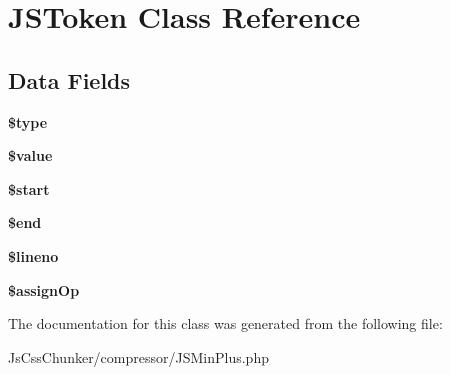 \hypertarget{class_j_s_token}{
\section{JSToken Class Reference}
\label{class_j_s_token}
}
\subsection*{Data Fields}
\begin{DoxyCompactItemize}
\item 
\hypertarget{class_j_s_token_a9a4a6fba2208984cabb3afacadf33919}{
{\bfseries \$type}}
\label{class_j_s_token_a9a4a6fba2208984cabb3afacadf33919}

\item 
\hypertarget{class_j_s_token_a0f298096f322952a72a50f98a74c7b60}{
{\bfseries \$value}}
\label{class_j_s_token_a0f298096f322952a72a50f98a74c7b60}

\item 
\hypertarget{class_j_s_token_a50a00e7de77365e00b117e73aa82fb9b}{
{\bfseries \$start}}
\label{class_j_s_token_a50a00e7de77365e00b117e73aa82fb9b}

\item 
\hypertarget{class_j_s_token_ac2040b96cd66d4d79b1d9fe0027d2f9b}{
{\bfseries \$end}}
\label{class_j_s_token_ac2040b96cd66d4d79b1d9fe0027d2f9b}

\item 
\hypertarget{class_j_s_token_a865384ce49abf1c78f8aea48c7b5aa48}{
{\bfseries \$lineno}}
\label{class_j_s_token_a865384ce49abf1c78f8aea48c7b5aa48}

\item 
\hypertarget{class_j_s_token_ade1832ae0fb4317657c735b13166c843}{
{\bfseries \$assignOp}}
\label{class_j_s_token_ade1832ae0fb4317657c735b13166c843}

\end{DoxyCompactItemize}


The documentation for this class was generated from the following file:\begin{DoxyCompactItemize}
\item 
JsCssChunker/compressor/JSMinPlus.php\end{DoxyCompactItemize}
